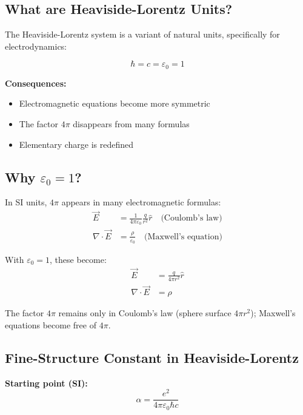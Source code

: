 	\subsection{What are Heaviside-Lorentz Units?}
	
	The Heaviside-Lorentz system is a variant of natural units, specifically for electrodynamics:
	
	\begin{equation}
		\boxed{\hbar = c = \varepsilon_0 = 1}
	\end{equation}
	
	\textbf{Consequences:}
	\begin{itemize}
		\item Electromagnetic equations become more symmetric
		\item The factor $4\pi$ disappears from many formulas
		\item Elementary charge is redefined
	\end{itemize}
	
	\subsection[Why epsilon 0 = 1]{Why $\varepsilon_0 = 1$?}
	
	In SI units, $4\pi$ appears in many electromagnetic formulas:
	\begin{align}
		\vec{E} &= \frac{1}{4\pi\varepsilon_0} \frac{q}{r^2} \hat{r} \quad \text{(Coulomb's law)} \\
		\nabla \cdot \vec{E} &= \frac{\rho}{\varepsilon_0} \quad \text{(Maxwell's equation)}
	\end{align}
	
	With $\varepsilon_0 = 1$, these become:
	\begin{align}
		\vec{E} &= \frac{q}{4\pi r^2} \hat{r} \\
		\nabla \cdot \vec{E} &= \rho
	\end{align}
	
	The factor $4\pi$ remains only in Coulomb's law (sphere surface $4\pi r^2$); Maxwell's equations become free of $4\pi$.
	
	\subsection{Fine-Structure Constant in Heaviside-Lorentz}
	
	\textbf{Starting point (SI):}
	\begin{equation}
		\alpha = \frac{e^2}{4\pi\varepsilon_0\hbar c}
	\end{equation}
	
